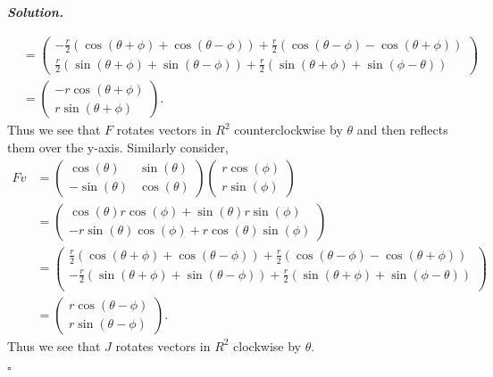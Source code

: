 \documentclass[12pt]{report}
\newenvironment{solution}[1][\it{Solution}]{\textbf{#1. } }{$\square$}
\begin{document}
\begin{solution}
\begin{enumerate}
\begin{align*}
            &= \begin{pmatrix}
                -\frac{r}{2}(\cos(\theta + \phi) + \cos(\theta - \phi)) + \frac{r}{2}(\cos(\theta - \phi) -\cos(\theta + \phi))\\
                \frac{r}{2}(\sin(\theta + \phi) + \sin(\theta - \phi))+\frac{r}{2}(\sin(\theta + \phi) + \sin(\phi - \theta))
            \end{pmatrix}\\
            &= \begin{pmatrix}
                -r\cos(\theta + \phi)\\
                r\sin(\theta + \phi)
            \end{pmatrix}.
        \end{align*}
        Thus we see that $F$ rotates vectors in $R^2$ counterclockwise by $\theta$ and then reflects them over the y-axis. Similarly consider,
        \begin{align*}
            Fv &=\begin{pmatrix}
                \cos(\theta) & \sin(\theta)\\
                -\sin(\theta) & \cos(\theta)
            \end{pmatrix}\begin{pmatrix}
                r\cos(\phi)\\r\sin(\phi)
            \end{pmatrix}\\
            &=\begin{pmatrix}\cos \left(\theta\right)r\cos \left(\phi\right)+\sin \left(\theta\right)r\sin \left(\phi\right)\\ -r\sin \left(\theta\right)\cos \left(\phi\right)+r\cos \left(\theta\right)\sin \left(\phi\right)\end{pmatrix}\\
            &=\begin{pmatrix}
                \frac{r}{2}(\cos(\theta + \phi) + \cos(\theta - \phi)) + \frac{r}{2}(\cos(\theta - \phi) -\cos(\theta + \phi))\\
                -\frac{r}{2}(\sin(\theta + \phi) + \sin(\theta - \phi))+\frac{r}{2}(\sin(\theta + \phi) + \sin(\phi - \theta))\\
            \end{pmatrix}\\
                &= \begin{pmatrix}
                    r\cos(\theta - \phi)\\
                    r\sin(\theta - \phi)
                \end{pmatrix}.
        \end{align*}
        Thus we see that $J$ rotates vectors in $R^2$ clockwise by $\theta$.


\end{enumerate}
\end{solution}
\end{document}
